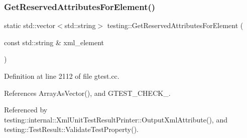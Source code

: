 \subsubsection{\texorpdfstring{Get\+Reserved\+Attributes\+For\+Element()}{GetReservedAttributesForElement()}}
{\footnotesize\ttfamily static std\+::vector$<$std\+::string$>$ testing\+::\+Get\+Reserved\+Attributes\+For\+Element (\begin{DoxyParamCaption}\item[{const std\+::string \&}]{xml\+\_\+element }\end{DoxyParamCaption})\hspace{0.3cm}{\ttfamily [static]}}



Definition at line 2112 of file gtest.\+cc.



References Array\+As\+Vector(), and G\+T\+E\+S\+T\+\_\+\+C\+H\+E\+C\+K\+\_\+.



Referenced by testing\+::internal\+::\+Xml\+Unit\+Test\+Result\+Printer\+::\+Output\+Xml\+Attribute(), and testing\+::\+Test\+Result\+::\+Validate\+Test\+Property().


